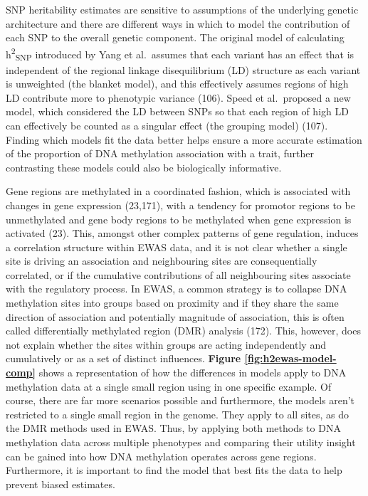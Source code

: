 \documentclass[11pt,oneside]{bristolthesis}
\begin{document}
SNP heritability estimates are sensitive to assumptions of the underlying genetic architecture and there are different ways in which to model the contribution of each SNP to the overall genetic component. The original model of calculating h\textsuperscript{2}\textsubscript{SNP} introduced by Yang et al.~assumes that each variant has an effect that is independent of the regional linkage disequilibrium (LD) structure as each variant is unweighted (the blanket model), and this effectively assumes regions of high LD contribute more to phenotypic variance (106). Speed et al.~proposed a new model, which considered the LD between SNPs so that each region of high LD can effectively be counted as a singular effect (the grouping model) (107). Finding which models fit the data better helps ensure a more accurate estimation of the proportion of DNA methylation association with a trait, further contrasting these models could also be biologically informative.

Gene regions are methylated in a coordinated fashion, which is associated with changes in gene expression (23,171), with a tendency for promotor regions to be unmethylated and gene body regions to be methylated when gene expression is activated (23). This, amongst other complex patterns of gene regulation, induces a correlation structure within EWAS data, and it is not clear whether a single site is driving an association and neighbouring sites are consequentially correlated, or if the cumulative contributions of all neighbouring sites associate with the regulatory process. In EWAS, a common strategy is to collapse DNA methylation sites into groups based on proximity and if they share the same direction of association and potentially magnitude of association, this is often called differentially methylated region (DMR) analysis (172). This, however, does not explain whether the sites within groups are acting independently and cumulatively or as a set of distinct influences. \textbf{Figure \ref{fig:h2ewas-model-comp}} shows a representation of how the differences in models apply to DNA methylation data at a single small region using in one specific example. Of course, there are far more scenarios possible and furthermore, the models aren't restricted to a single small region in the genome. They apply to all sites, as do the DMR methods used in EWAS. Thus, by applying both methods to DNA methylation data across multiple phenotypes and comparing their utility insight can be gained into how DNA methylation operates across gene regions. Furthermore, it is important to find the model that best fits the data to help prevent biased estimates.
\end{document}
